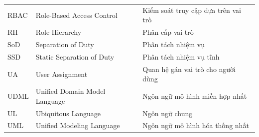 \begin{center}
\begin{tabularx}{\textwidth}{@{}lXX@{}}
RBAC   & Role-Based Access Control & Kiểm soát truy cập dựa trên vai trò \\
RH     & Role Hierarchy & Phân cấp vai trò \\
SoD    & Separation of Duty & Phân tách nhiệm vụ \\
SSD    & Static Separation of Duty & Phân tách nhiệm vụ tĩnh \\
UA     & User Assignment & Quan hệ gán vai trò cho người dùng \\
UDML   & Unified Domain Model Language & Ngôn ngữ mô hình miền hợp nhất \\
UL     & Ubiquitous Language & Ngôn ngữ chung \\
UML    & Unified Modeling Language & Ngôn ngữ mô hình hóa thống nhất \\
\bottomrule
\end{tabularx}
\end{center}
